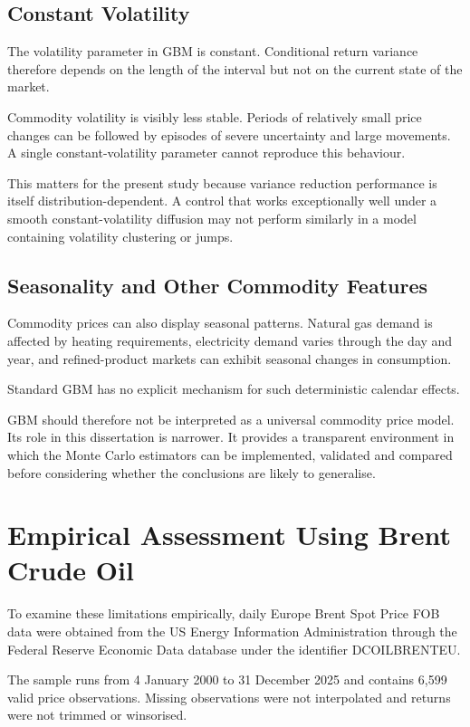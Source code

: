 \subsection{Constant Volatility}

The volatility parameter in GBM is constant. Conditional return variance therefore depends on the length of the interval but not on the current state of the market.

Commodity volatility is visibly less stable. Periods of relatively small price changes can be followed by episodes of severe uncertainty and large movements. A single constant-volatility parameter cannot reproduce this behaviour.

This matters for the present study because variance reduction performance is itself distribution-dependent. A control that works exceptionally well under a smooth constant-volatility diffusion may not perform similarly in a model containing volatility clustering or jumps.

\subsection{Seasonality and Other Commodity Features}

Commodity prices can also display seasonal patterns. Natural gas demand is affected by heating requirements, electricity demand varies through the day and year, and refined-product markets can exhibit seasonal changes in consumption.

Standard GBM has no explicit mechanism for such deterministic calendar effects.

GBM should therefore not be interpreted as a universal commodity price model. Its role in this dissertation is narrower. It provides a transparent environment in which the Monte Carlo estimators can be implemented, validated and compared before considering whether the conclusions are likely to generalise.

\section{Empirical Assessment Using Brent Crude Oil}

To examine these limitations empirically, daily Europe Brent Spot Price FOB data were obtained from the US Energy Information Administration through the Federal Reserve Economic Data database under the identifier DCOILBRENTEU.

The sample runs from 4 January 2000 to 31 December 2025 and contains 6,599 valid price observations. Missing observations were not interpolated and returns were not trimmed or winsorised.

